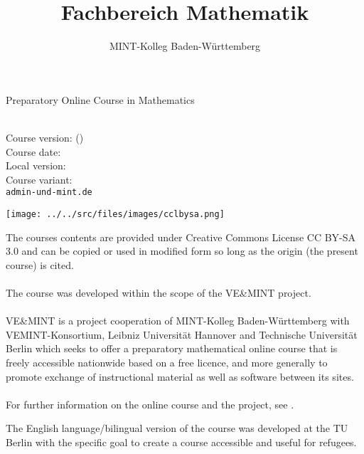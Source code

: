 

\title{Fachbereich Mathematik}
\author{MINT-Kolleg Baden-W\"urttemberg}



\MSetSubject{\MINTMathematics}

\begin{framed}
\begin{center}
\LARGE
Preparatory Online Course in Mathematics\\
\large
\end{center}
\ \\
Course version: \MSignatureMain (\MSignatureVersion) \\
Course date: \MSignatureDate \\
Local version: \MSignatureLocalization \\ 
Course variant: \MSignatureVariant \\
\scriptsize \texttt{admin\@@ve-und-mint.de}
\end{framed}

\begin{center}
\texttt{[image: ../../src/files/images/cclbysa.png]}
\end{center}
The courses contents are provided under Creative Commons License CC BY-SA 3.0 and can be
copied or used in modified form so long as the origin (the present course) is cited.
\ \\ \ \\
The course was developed within the scope of the VE\&MINT project.
\ \\ \ \\
VE\&MINT is a project cooperation of MINT-Kolleg Baden-Württemberg
with VEMINT-Konsortium, Leibniz Universität Hannover and Technische Universität Berlin which seeks to
offer a preparatory mathematical online course that is freely accessible nationwide based on a free licence,
and more generally to promote exchange of instructional material as well as software between its sites.
\ \\ \ \\
For further information on the online course and the project, see .

The English language/bilingual version of the course was developed at the TU Berlin with the specific goal to create a course
accessible and useful for refugees.



\tableofcontents



\MPrintIndex


